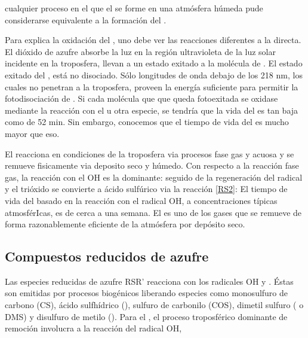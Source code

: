 cualquier proceso en el que el  se forme en una atmósfera húmeda pude considerarse equivalente a la formación del .

Para explica la oxidación del , uno debe ver las reacciones diferentes a la directa. El dióxido de azufre absorbe la luz en la región ultravioleta de  la luz solar incidente en la troposfera, llevan a un estado exitado a la molécula de .
El estado exitado del , está no disociado. S\'olo longitudes de onda debajo de los 218 nm, los cuales no penetran a la troposfera, proveen la energía suficiente para permitir la fotodisociación de . Si cada molécula que  que queda fotoexitada se oxidase mediante la reacción con el  u otra especie, se tendría que la vida del  es tan baja como de 52 min. Sin embargo, conocemos que el tiempo de vida del  es mucho mayor que eso.

El   reacciona en condiciones de la troposfera via procesos fase gas y acuosa y se remueve fisicamente via deposito seco y húmedo. Con respecto a la reacción fase gas, la reacción con el OH es la dominante:
seguido de la regeneración del radical 
y el trióxido se convierte a ácido sulfúrico via la reacción \ref{RS2}:
El tiempo de vida del  basado en la reacción con el radical OH, a concentraciones típicas atmosférIcas, es de cerca a una semana. El  es uno de los gases que se remueve de forma razonablemente eficiente de la atmósfera por depósito seco.

\subsection{Compuestos reducidos de azufre}
Las especies reducidas de azufre  RSR' reacciona con los radicales OH y . Éstas son emitidas por procesos biogénicos liberando especies como monosulfuro de carbono (CS), ácido sulfhídrico (), sulfuro de carbonilo (COS), dimetil sulfuro ( o DMS) y disulfuro de metilo (). Para el , el proceso troposférico dominante de remoción involucra a la reacción del radical OH,


